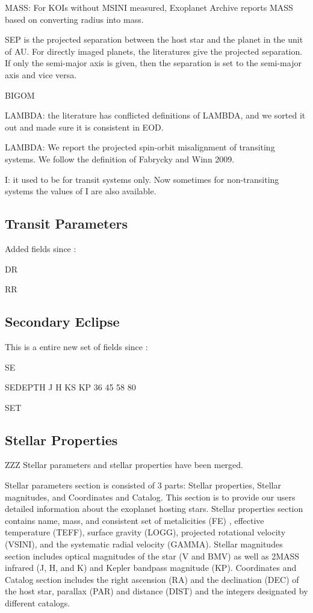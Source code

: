 \documentclass[11pt,preprint]{aastex}
\begin{document}
\begin{CJK*}{UTF8}{gbsn}
MASS: For KOIs without MSINI measured, Exoplanet Archive reports MASS
based on converting radius into mass.


SEP is the projected separation between the host star and the planet in the unit of AU. For directly imaged planets, the literatures give the projected separation. If only the semi-major axis is given, then the separation is set to the semi-major axis and vice versa.  

BIGOM

LAMBDA: the literature has conflicted definitions of LAMBDA, and we
sorted it out and made sure it is consistent in EOD.

LAMBDA: We report the projected spin-orbit misalignment of transiting systems. We follow the definition of Fabrycky and Winn 2009. 

I: it used to be for transit systems only. Now sometimes for
non-transiting systems the values of I are also available.


\subsection{Transit Parameters}

Added fields since \cite{Wright2011}:

DR

RR

\subsection{Secondary Eclipse}

This is a entire new set of fields since \cite{Wright2011}:

SE

SEDEPTH J H KS KP 36 45 58 80

SET


\subsection{Stellar Properties}
ZZZ Stellar parameters and stellar properties have been merged. 

Stellar parameters section is consisted of 3 parts: Stellar properties, Stellar magnitudes, and Coordinates and Catalog. This section is to provide our users detailed information about the exoplanet hosting stars. Stellar properties section contains name, mass, and consistent set of metalicities (FE) , effective temperature (TEFF), surface gravity (LOGG), projected rotational velocity (VSINI), and the systematic radial velocity (GAMMA). Stellar magnitudes section includes optical magnitudes of the star (V and BMV) as well as 2MASS infrared (J, H, and K) and Kepler bandpass magnitude (KP). Coordinates and Catalog section includes the right ascension (RA) and the declination (DEC) of the host star, parallax (PAR) and distance (DIST) and the integers designated by different catalogs. 


\end{CJK*}
\end{document}
